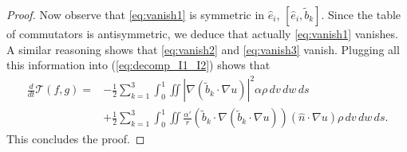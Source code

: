 \documentclass[11pt]{amsart}
\numberwithin{equation}{section}
\begin{document}
\begin{proof}
% 
Now observe that \eqref{eq:vanish1} is symmetric in $\hat e_i$, $[\hat e_i,\tilde b_k]$. Since the table of commutators is antisymmetric, we deduce that actually \eqref{eq:vanish1} vanishes. 
%
A similar reasoning shows that \eqref{eq:vanish2} and \eqref{eq:vanish3} vanish. Plugging all this information into (\ref{eq:decomp_I1_I2}) shows that
%
%
\begin{align}\label{eq:deriv_w2_final}
  \frac{d}{dt}\mathcal T (f,g) 
  =& 	-\frac{1}{2}\sum_{k=1}^{3}\int_{0}^{1}\iint\left|\nabla\left(\tilde{b}_{k}\cdot\nabla u\right)\right|^{2}\alpha\rho\,dv\,dw\,ds\\
  & +\frac{1}{2}\sum_{k=1}^{3} \int_0^1\iint\frac{\alpha'}{r}\left(\tilde{b}_{k}\cdot\nabla\left(\tilde{b}_{k}\cdot\nabla u\right)\right)\left(\hat{n}\cdot\nabla u\right)\rho\,dv\,dw\,ds.
  \nonumber
\end{align}
%
This concludes the proof. 
 
\end{proof}
\end{document}
